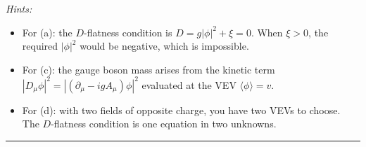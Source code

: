 \documentclass[11pt,a4paper]{article}
\begin{document}
\medskip

\noindent\textit{Hints:}
\begin{itemize}
  \item For (a): the $D$-flatness condition is $D = g|\phi|^2 + \xi = 0$.
    When $\xi > 0$, the required $|\phi|^2$ would be negative, which is
    impossible.
  \item For (c): the gauge boson mass arises from the kinetic term
    $|D_\mu\phi|^2 = |(\partial_\mu - igA_\mu)\phi|^2$ evaluated at the
    VEV $\langle\phi\rangle = v$.
  \item For (d): with two fields of opposite charge, you have two VEVs
    to choose.  The $D$-flatness condition is one equation in two
    unknowns.
\end{itemize}

\bigskip
\hrule
\bigskip
\end{document}
